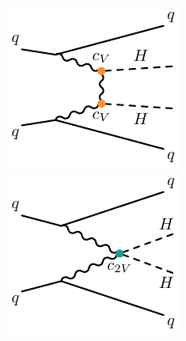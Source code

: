 \begin{figure}[!thp]
    \begin{minipage}[c]{.31\textwidth}
        \includegraphics[width=\textwidth]{chapters/chapter1_theory/images/vbf_cv.pdf}
    \end{minipage}
    \begin{minipage}[c]{.31\textwidth}
        \includegraphics[width=\textwidth]{chapters/chapter1_theory/images/vbf_c2v.pdf}

\end{minipage}
\end{figure}
